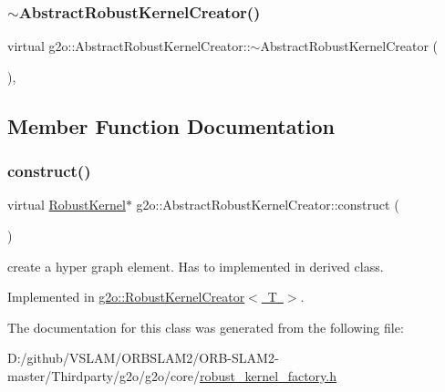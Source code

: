 \subsubsection{\texorpdfstring{$\sim$\+Abstract\+Robust\+Kernel\+Creator()}{~AbstractRobustKernelCreator()}}
{\footnotesize\ttfamily virtual g2o\+::\+Abstract\+Robust\+Kernel\+Creator\+::$\sim$\+Abstract\+Robust\+Kernel\+Creator (\begin{DoxyParamCaption}{ }\end{DoxyParamCaption})\hspace{0.3cm}{\ttfamily [inline]}, {\ttfamily [virtual]}}



\subsection{Member Function Documentation}
\mbox{\label{classg2o_1_1_abstract_robust_kernel_creator_a3022ab9279e52151d37f8cb4d1524d47}} 
\subsubsection{\texorpdfstring{construct()}{construct()}}
{\footnotesize\ttfamily virtual \mbox{\hyperlink{classg2o_1_1_robust_kernel}{Robust\+Kernel}}$\ast$ g2o\+::\+Abstract\+Robust\+Kernel\+Creator\+::construct (\begin{DoxyParamCaption}{ }\end{DoxyParamCaption})\hspace{0.3cm}{\ttfamily [pure virtual]}}

create a hyper graph element. Has to implemented in derived class. 

Implemented in \mbox{\hyperlink{classg2o_1_1_robust_kernel_creator_a6ab30adc017675641bd55502d7da0085}{g2o\+::\+Robust\+Kernel\+Creator$<$ T $>$}}.



The documentation for this class was generated from the following file\+:\begin{DoxyCompactItemize}
\item 
D\+:/github/\+V\+S\+L\+A\+M/\+O\+R\+B\+S\+L\+A\+M2/\+O\+R\+B-\/\+S\+L\+A\+M2-\/master/\+Thirdparty/g2o/g2o/core/\mbox{\hyperlink{robust__kernel__factory_8h}{robust\+\_\+kernel\+\_\+factory.\+h}}\end{DoxyCompactItemize}
